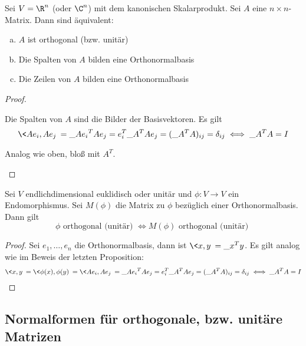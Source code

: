 \documentclass{mycourse}
\begin{document}
\begin{prop}
	\label{prop:13.18}
	Sei $V = \R^n$ (oder $\C^n$) mit dem kanonischen Skalarprodukt.
	Sei $A$ eine $n\times n$-Matrix.
	Dann sind äquivalent:
	\begin{enumerate}[(a)]
		\item
			$A$ ist orthogonal (bzw. unitär)
		\item
			Die Spalten von $A$ bilden eine Orthonormalbasis
		\item
			Die Zeilen von $A$ bilden eine Orthonormalbasis
	\end{enumerate}
	\begin{proof}~
		\begin{seg}[„$a \iff b$“]
			Die Spalten von $A$ sind die Bilder der Basisvektoren.
			Es gilt
			\[
				\<Ae_i,Ae_j\> = \_{Ae_i}^TAe_j = e_i^T\_A^TAe_j = (\_A^TA)_{ij} = \delta_{ij} \iff \_A^TA = I
			\]
		\end{seg}
		\begin{seg}[„$a \iff c$“]
			Analog wie oben, bloß mit $A^T$.
		\end{seg}
	\end{proof}
\end{prop}

\begin{prop}
	\label{prop:13.19}
	Sei $V$ endlichdimensional euklidisch oder unitär und $\phi:V\to V$ ein Endomorphismus.
	Sei $M(\phi)$ die Matrix zu $\phi$ bezüglich einer Orthonormalbasis.
	Dann gilt
	\[
		\phi \text{ orthogonal (unitär) } \iff M(\phi) \text{ orthogonal (unitär) }
	\]
	\begin{proof}
		Sei $e_1,\dotsc, e_n$ die Orthonormalbasis, dann ist $\<x,y\>=\_x^Ty$.
		Es gilt analog wie im Beweis der letzten Proposition:
		\begin{align*}
			\<x,y\> = \<\phi(x),\phi(y)\> = \<Ae_i,Ae_j\> = \_{Ae_i}^TAe_j = e_i^T\_A^TAe_j = (\_A^TA)_{ij} = \delta_{ij} \iff \_A^TA = I
		\end{align*}
	\end{proof}
\end{prop}

\subsection{Normalformen für orthogonale, bzw. unitäre Matrizen}
\end{document}
